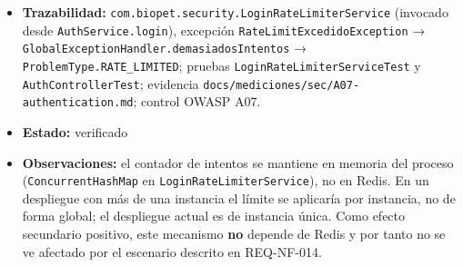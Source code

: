 \documentclass[
  spanish,
]{article}
\begin{document}
\begin{itemize}
  \texttt{quinto\allowbreak{}Intento\allowbreak{}Fallido\allowbreak{}Sigue\allowbreak{}Respondiendo401},
  \texttt{sexto\allowbreak{}Intento\allowbreak{}Fallido\allowbreak{}Devuelve429\allowbreak{}Problem\allowbreak{}Detail},
  \texttt{ip\allowbreak{}Bloqueada\allowbreak{}Rechaza\allowbreak{}Incluso\allowbreak{}Credenciales\allowbreak{}Correctas},
  \texttt{intentos\allowbreak{}Desde\allowbreak{}Ips\allowbreak{}Distintas\allowbreak{}No\allowbreak{}Se\allowbreak{}Acumulan},
  \texttt{login\allowbreak{}Exitoso\allowbreak{}Reinicia\allowbreak{}Contador\allowbreak{}De\allowbreak{}La\allowbreak{}Ip}. Criterio 7: inspección de
  las anotaciones \texttt{@Value} del constructor de
  \texttt{Login\allowbreak{}Rate\allowbreak{}Limiter\allowbreak{}Service}. Evidencia HTTP real (\texttt{curl})
  en \texttt{docs/\allowbreak{}mediciones/\allowbreak{}sec/\allowbreak{}A07-\allowbreak{}authentication.\allowbreak{}md} con
  \texttt{docs/\allowbreak{}mediciones/\allowbreak{}sec/\allowbreak{}raw/\allowbreak{}A07-\allowbreak{}auth-\allowbreak{}rate-\allowbreak{}limit.\allowbreak{}txt}: cinco
  \texttt{401}, un \texttt{429} con
  \texttt{type=urn:biopet:\allowbreak{}error:rate-\allowbreak{}limited} y
  \texttt{Retry-\allowbreak{}After:\ 900}.
\item
  \textbf{Trazabilidad:}
  \texttt{com.\allowbreak{}biopet.\allowbreak{}security.\allowbreak{}Login\allowbreak{}Rate\allowbreak{}Limiter\allowbreak{}Service} (invocado desde
  \texttt{Auth\allowbreak{}Service.\allowbreak{}login}), excepción
  \texttt{Rate\allowbreak{}Limit\allowbreak{}Excedido\allowbreak{}Exception} →
  \texttt{Global\allowbreak{}Exception\allowbreak{}Handler.\allowbreak{}demasiados\allowbreak{}Intentos} →
  \texttt{Problem\allowbreak{}Type.\allowbreak{}RATE\_\allowbreak{}LIMITED}; pruebas
  \texttt{Login\allowbreak{}Rate\allowbreak{}Limiter\allowbreak{}Service\allowbreak{}Test} y \texttt{Auth\allowbreak{}Controller\allowbreak{}Test};
  evidencia \texttt{docs/\allowbreak{}mediciones/\allowbreak{}sec/\allowbreak{}A07-\allowbreak{}authentication.\allowbreak{}md}; control
  OWASP A07.
\item
  \textbf{Estado:} verificado
\item
  \textbf{Observaciones:} el contador de intentos se mantiene en memoria
  del proceso (\texttt{Concurrent\allowbreak{}Hash\allowbreak{}Map} en
  \texttt{Login\allowbreak{}Rate\allowbreak{}Limiter\allowbreak{}Service}), no en Redis. En un despliegue con
  más de una instancia el límite se aplicaría por instancia, no de forma
  global; el despliegue actual es de instancia única. Como efecto
  secundario positivo, este mecanismo \textbf{no} depende de Redis y por
  tanto no se ve afectado por el escenario descrito en REQ-NF-014.
\end{itemize}
\end{document}
